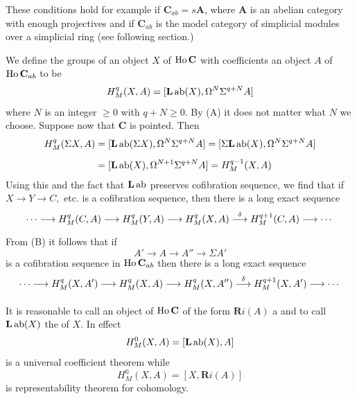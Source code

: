 \documentclass[../main]{subfiles}
\begin{document}
These conditions hold for example if  $\mathbf C_{ab} = s \mathbf A$, where $\mathbf A$ is an abelian category with enough projectives and if $\mathbf C_{ab}$ is the model category of simplicial modules over a simplicial ring (see following section.)

We define the  groups of an object $X$ of $\operatorname{Ho} \mathbf C$ with coefficients an object $A$ of $\operatorname{Ho} \mathbf C_{ab}$ to be 
\[ 
  H_{M}^q(X,A) = [\mathbf L \operatorname{ab} (X), \Omega^N\Sigma^{q+N}A]
\] 
where $N$ is an integer $\ge 0$ with $q+N\ge 0$. By (A) it does not matter what $N$ we choose. Suppose now that $\mathbf C$ is pointed. Then 
\begin{align*}
  H_{M}^{q} (\Sigma X, A) &= [\mathbf{L}\operatorname{ab} (\Sigma X), \Omega^N\Sigma^{q+N}A] = [\Sigma \mathbf{L}\operatorname{ab} (X), \Omega^N\Sigma^{q+N}A]\\[0.5em]
                          &= [\mathbf{L}\operatorname{ab} (X), \Omega^{N+1}\Sigma^{q+N}A] = H_{M}^{q-1} (X,A)
\end{align*}
Using this and the fact that $\mathbf{L}\operatorname{ab} $ preserves cofibration sequence, we find that if $X \longrightarrow  Y \longrightarrow  C,$ etc. is a cofibration sequence, then there is a long exact sequence
\[ 
  \cdots \longrightarrow  H_{M}^{q} (C,A) \longrightarrow  H_{M}^{q} (Y,A) \longrightarrow  H_{M}^{q}(X,A) \varrightarrow{\delta } H_{M}^{q+1} (C,A) \longrightarrow   \cdots
\] 
From (B) it follows that if \[A'\longrightarrow A\longrightarrow A'' \longrightarrow \Sigma A'\]
is a cofibration sequence in $\operatorname{Ho} \mathbf{C}_{ab}$ then there is a long exact sequence
\[\cdots\longrightarrow  H_{M}^{q} (X,A') \longrightarrow  H_{M}^{q} (X,A) \longrightarrow  H_{M}^{q}(X,A'') \varrightarrow{\delta } H_{M}^{q+1} (X,A') \longrightarrow\cdots \]

It is reasonable to call an object of $\operatorname{Ho} \mathbf{C}$ of the form $\mathbf{R} i(A)$ a  and to call $\mathbf{L}\operatorname{ab} (X)$ the  of $X$. In effect
\[ 
  H_{M}^{0}(X,A) = [\mathbf{L}\operatorname{ab} (X),A]
\] 
is a universal coefficient theorem while 
\[ 
  H_{M}^{0} (X,A) = [X, \mathbf{R} i(A)]
\] 
is representability theorem for cohomology.
\end{document}
